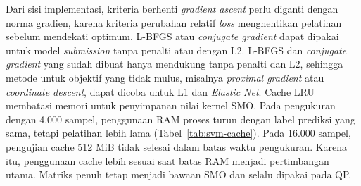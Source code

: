 Dari sisi implementasi, kriteria berhenti \textit{gradient ascent} perlu
diganti dengan norma gradien, karena kriteria perubahan relatif
\textit{loss} menghentikan pelatihan sebelum mendekati optimum. L-BFGS atau
\textit{conjugate gradient} dapat dipakai untuk model \textit{submission}
tanpa penalti atau dengan L2. L-BFGS dan \textit{conjugate gradient} yang
sudah dibuat hanya mendukung tanpa penalti dan L2, sehingga metode untuk
objektif yang tidak mulus, misalnya \textit{proximal gradient} atau
\textit{coordinate descent}, dapat dicoba untuk L1 dan \textit{Elastic Net}.
Cache LRU membatasi memori untuk penyimpanan nilai kernel SMO. Pada
pengukuran dengan 4.000 sampel, penggunaan RAM proses turun dengan label
prediksi yang sama, tetapi pelatihan lebih lama (Tabel~\ref{tab:svm-cache}).
Pada 16.000 sampel, pengujian cache 512 MiB tidak selesai dalam batas waktu
pengukuran. Karena itu, penggunaan cache lebih sesuai saat batas RAM menjadi
pertimbangan utama. Matriks penuh tetap menjadi bawaan SMO dan selalu
dipakai pada QP.
